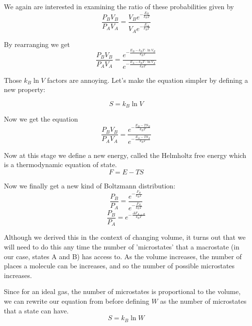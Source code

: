 We again are interested in examining the ratio of these probabilities given by
\begin{equation}
    \frac{P_B V_B}{P_A V_A} = \frac{V_Be^{-\frac{E_B}{k_BT}}}{V_Ae^{-\frac{E_A}{k_BT}}}
\end{equation}

By rearranging we get
\begin{equation}
    \frac{P_B V_B}{P_A V_A} = \frac{e^{-\frac{E_B - k_BT\cdot \ln{V_B}}{k_BT}}}{e^{-\frac{E_A - k_BT\cdot \ln{V_A}}{k_BT}}}
\end{equation}

Those $k_B\ln V$ factors are annoying.
Let's make the equation simpler by defining a new property:

\begin{equation}
    S = k_B \ln V
\end{equation}

Now we get the equation
\begin{equation}
    \frac{P_B V_B}{P_A V_A} = \frac{e^{-\frac{E_B - TS_B}{k_BT}}}{e^{-\frac{E_A - TS_A}{k_BT}}}
\end{equation}

Now at this stage we define a new energy, called the Helmholtz free energy which is a thermodynamic equation of state.
\begin{equation}
    F = E - TS
\end{equation}

Now we finally get a new kind of Boltzmann distribution:
\begin{equation}
    \frac{P_B}{P_A} = \frac{e^{-\frac{F_B}{k_BT}}}{e^{-\frac{F_A}{k_BT}}}
\end{equation}
\begin{equation}
    \frac{P_B}{P_A} = e^{-\frac{\Delta F_{A \rightarrow B}}{k_BT}}
\end{equation}

Although we derived this in the context of changing volume, it turns out that we will need to do this any time the number of 'microstates' that a macrostate (in our case, states A and B) has access to. 
As the volume increases, the number of places a molecule can be increases, and so the number of possible microstates increases.

Since for an ideal gas, the number of microstates is proportional to the volume, we can rewrite our equation from before defining $W$ as the number of microstates that a state can have.
\begin{equation}
    S = k_B\ln W \label{eq:entropy}
\end{equation}

